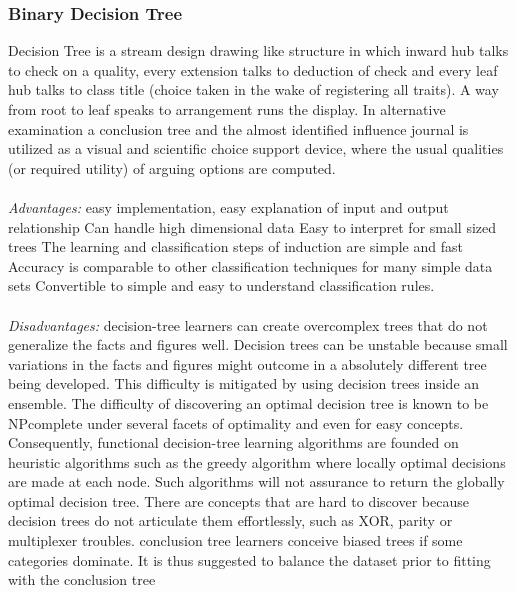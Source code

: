 \documentclass[12pt, letterpaper]{article}
\begin{document}
\subsubsection{Binary   Decision Tree}
Decision Tree is a stream design drawing like structure in which inward hub talks to check on a quality, every extension talks to deduction of check and every leaf hub talks to class title (choice taken in the wake of registering all traits). A way from root to leaf speaks to arrangement runs the display. In alternative examination a conclusion tree and the almost identified influence journal is utilized as a visual and scientific choice support device, where the usual qualities (or required utility) of arguing options are computed.
\\
\\
\emph{Advantages:} easy implementation, easy explanation of input and output relationship Can handle high dimensional data Easy to interpret for small sized trees The learning and classification steps of induction are simple and fast Accuracy is comparable to other classification techniques for many simple data sets Convertible to simple and easy to understand classification rules.
\\
\\
\emph{Disadvantages:} decision-tree learners can create overcomplex trees that do not generalize the facts and figures well. Decision trees can be unstable because small variations in the facts and figures might outcome in a absolutely different tree being developed. This difficulty is mitigated by using decision trees inside an ensemble. The difficulty of discovering an optimal decision tree is known to be NPcomplete under several facets of optimality and even for easy concepts. Consequently, functional decision-tree learning algorithms are founded on heuristic algorithms such as the greedy algorithm where locally optimal decisions are made at each node. Such algorithms will not assurance to return the globally optimal decision tree. There are concepts that are hard to discover because decision trees do not articulate them effortlessly, such as XOR, parity or multiplexer troubles. conclusion tree learners conceive biased trees if some categories dominate. It is thus suggested to balance the dataset prior to fitting with the conclusion tree
\\
\\
\end{document}
